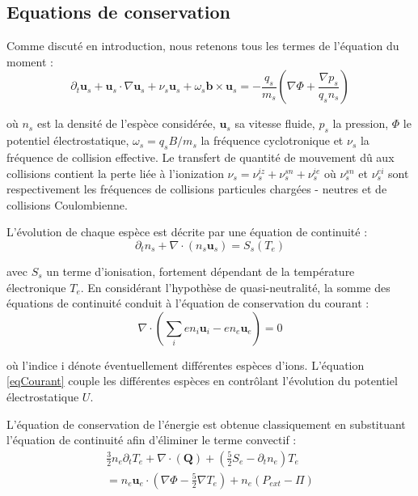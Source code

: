 \begin{refsection}
\subsection{Equations de conservation}
Comme discuté en introduction, nous retenons tous les termes de l'équation du
moment :
\begin{equation}
\partial_t \mathbf{u}_s + \mathbf{u}_s\cdot\nabla\mathbf{u}_s+
\nu_s\mathbf{u}_s+\omega_s\mathbf{b}\times\mathbf{u}_s=
-\frac{q_s}{m_s}\left(\nabla \Phi+\frac{\nabla p_s}{q_sn_s}\right)
\end{equation}

où $n_s$ est la densité de l'espèce considérée, $\mathbf{u}_s$ sa vitesse
fluide, $p_s$ la pression, $\Phi$ le potentiel électrostatique,
$\omega_s=q_sB/m_s$ la fréquence cyclotronique et $\nu_s$ la fréquence de collision effective.
Le transfert de quantité de mouvement dû aux collisions contient la perte liée à
l'ionization $\nu_s=\nu_{s}^{iz}+\nu_{s}^{sn}+\nu_{s}^{ie}$ où $\nu_{s}^{sn}$ et
$\nu_{s}^{ei}$ sont respectivement les fréquences de collisions particules
chargées - neutres et de collisions Coulombienne.

L'évolution de chaque espèce est décrite par une équation de continuité :
\begin{equation}
\label{3-continuite}
\partial_t n_s + \nabla\cdot\left(n_s\mathbf{u}_s\right)=S_s(T_e)
\end{equation}

avec $S_s$ un terme d'ionisation, fortement dépendant de la
température électronique $T_e$. En considérant l'hypothèse de quasi-neutralité, la somme des
équations de continuité conduit à l'équation de conservation du courant :
\begin{equation}
\label{eqCourant}
\nabla\cdot(\sum_ien_i\mathbf{u}_i-en_e\mathbf{u}_e)=0
\end{equation}

où l'indice i dénote éventuellement différentes espèces d'ions. 
L'équation \eqref{eqCourant} couple les différentes espèces en contrôlant
l'évolution du potentiel électrostatique $U$.

L'équation de conservation de l'énergie est obtenue classiquement en substituant
l'équation de continuité afin d'éliminer le terme convectif :
\begin{equation}\begin{split}
\label{3-energie}
\frac{3}{2}n_e\partial_tT_e + \nabla\cdot(\mathbf{Q}) +
(\frac{5}{2}S_e-\partial_tn_e)T_e \\=n_e\mathbf{u}_e\cdot(\nabla
\Phi-\frac{5}{2}\nabla T_e)+n_e\left(P_{ext}-\Pi\right)
\end{split}
\end{equation}


\end{refsection}

